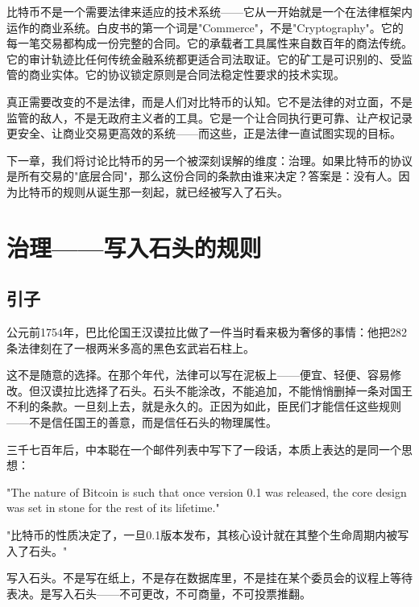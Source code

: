 \documentclass[a4paper,12pt,openany]{ctexbook}
\newenvironment{quoting}{%
  \par\vspace{0.5em}%
  \begin{list}{}{%
    \setlength{\leftmargin}{2em}%
    \setlength{\rightmargin}{2em}%
    \setlength{\parsep}{0.3em}%
    \setlength{\itemsep}{0pt}%
    \setlength{\topsep}{0pt}%
  }%
  \item\relax
}{%
  \end{list}%
  \par\vspace{0.5em}%
}
\begin{document}
比特币不是一个需要法律来适应的技术系统——它从一开始就是一个在法律框架内运作的商业系统。白皮书的第一个词是"Commerce"，不是"Cryptography"。它的每一笔交易都构成一份完整的合同。它的承载者工具属性来自数百年的商法传统。它的审计轨迹比任何传统金融系统都更适合司法取证。它的矿工是可识别的、受监管的商业实体。它的协议锁定原则是合同法稳定性要求的技术实现。

真正需要改变的不是法律，而是人们对比特币的认知。它不是法律的对立面，不是监管的敌人，不是无政府主义者的工具。它是一个让合同执行更可靠、让产权记录更安全、让商业交易更高效的系统——而这些，正是法律一直试图实现的目标。

下一章，我们将讨论比特币的另一个被深刻误解的维度：治理。如果比特币的协议是所有交易的"底层合同"，那么这份合同的条款由谁来决定？答案是：没有人。因为比特币的规则从诞生那一刻起，就已经被写入了石头。



\chapter{治理——写入石头的规则}



\section*{引子}


公元前1754年，巴比伦国王汉谟拉比做了一件当时看来极为奢侈的事情：他把282条法律刻在了一根两米多高的黑色玄武岩石柱上。

这不是随意的选择。在那个年代，法律可以写在泥板上——便宜、轻便、容易修改。但汉谟拉比选择了石头。石头不能涂改，不能追加，不能悄悄删掉一条对国王不利的条款。一旦刻上去，就是永久的。正因为如此，臣民们才能信任这些规则——不是信任国王的善意，而是信任石头的物理属性。

三千七百年后，中本聪在一个邮件列表中写下了一段话，本质上表达的是同一个思想：


\begin{quoting}
\small
"The nature of Bitcoin is such that once version 0.1 was released, the core design was set in stone for the rest of its lifetime."

"比特币的性质决定了，一旦0.1版本发布，其核心设计就在其整个生命周期内被写入了石头。"
\end{quoting}


写入石头。不是写在纸上，不是存在数据库里，不是挂在某个委员会的议程上等待表决。是写入石头——不可更改，不可商量，不可投票推翻。
\end{document}
